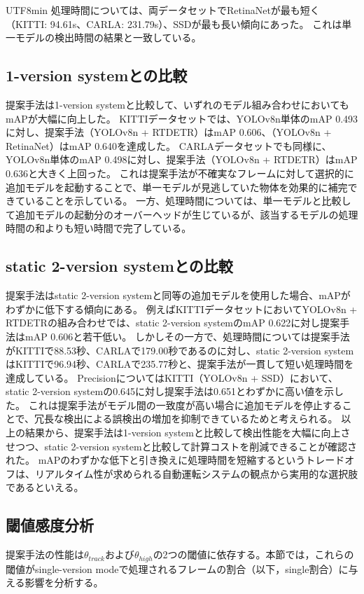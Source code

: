 \documentclass[conference, dvipdfmx]{IEEEtran}
\begin{document}
\begin{CJK}{UTF8}{min}
処理時間については、両データセットでRetinaNetが最も短く（KITTI: 94.61s、CARLA: 231.79s）、SSDが最も長い傾向にあった。
これは単一モデルの検出時間の結果と一致している。

\subsection{1-version systemとの比較}
提案手法は1-version systemと比較して、いずれのモデル組み合わせにおいてもmAPが大幅に向上した。
KITTIデータセットでは、YOLOv8n単体のmAP 0.493に対し、提案手法（YOLOv8n + RTDETR）はmAP 0.606、（YOLOv8n + RetinaNet）はmAP 0.640を達成した。
CARLAデータセットでも同様に、YOLOv8n単体のmAP 0.498に対し、提案手法（YOLOv8n + RTDETR）はmAP 0.636と大きく上回った。
これは提案手法が不確実なフレームに対して選択的に追加モデルを起動することで、単一モデルが見逃していた物体を効果的に補完できていることを示している。
一方、処理時間については、単一モデルと比較して追加モデルの起動分のオーバーヘッドが生じているが、該当するモデルの処理時間の和よりも短い時間で完了している。

\subsection{static 2-version systemとの比較}
提案手法はstatic 2-version systemと同等の追加モデルを使用した場合、mAPがわずかに低下する傾向にある。
例えばKITTIデータセットにおいてYOLOv8n + RTDETRの組み合わせでは、static 2-version systemのmAP 0.622に対し提案手法はmAP 0.606と若干低い。
しかしその一方で、処理時間については提案手法がKITTIで88.53秒、CARLAで179.00秒であるのに対し、static 2-version systemはKITTIで96.94秒、CARLAで235.77秒と、提案手法が一貫して短い処理時間を達成している。
PrecisionについてはKITTI（YOLOv8n + SSD）において、static 2-version systemの0.645に対し提案手法は0.651とわずかに高い値を示した。
これは提案手法がモデル間の一致度が高い場合に追加モデルを停止することで、冗長な検出による誤検出の増加を抑制できているためと考えられる。
以上の結果から、提案手法は1-version systemと比較して検出性能を大幅に向上させつつ、static 2-version systemと比較して計算コストを削減できることが確認された。
mAPのわずかな低下と引き換えに処理時間を短縮するというトレードオフは、リアルタイム性が求められる自動運転システムの観点から実用的な選択肢であるといえる。

\subsection{閾値感度分析}

提案手法の性能は$\theta_{track}$および$\theta_{high}$の2つの閾値に依存する。本節では，これらの閾値がsingle-version modeで処理されるフレームの割合（以下，single割合）に与える影響を分析する。


\end{CJK}
\end{document}

